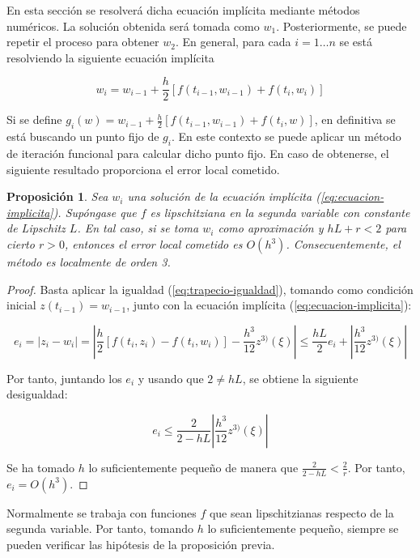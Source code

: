 \documentclass{article}
\theoremstyle{theorem-style}  %
\newtheorem{proposition}[theorem]{Proposición}
\theoremstyle{definition-style}
\theoremstyle{example-style}
\begin{document}
	En esta sección se resolverá dicha ecuación implícita mediante métodos numéricos. La solución obtenida será tomada como $w_1$. Posteriormente, se puede repetir el proceso para obtener $w_2$. En general, para cada $i = 1 \ldots n$ se está resolviendo la siguiente ecuación implícita

	\begin{equation} \label{eq:ecuacion-implicita}
		w_i = w_{i-1} + \frac{h}{2} \left[f(t_{i-1},w_{i-1}) + f(t_i, w_i)\right]
	\end{equation}

	Si se define $g_i(w) = w_{i-1} + \frac{h}{2} \left[f(t_{i-1},w_{i-1}) + f(t_i, w)\right]$, en definitiva se está buscando un punto fijo de $g_i$. En este contexto se puede aplicar un método de iteración funcional para calcular dicho punto fijo. En caso de obtenerse, el siguiente resultado proporciona el error local cometido.

	\begin{proposition} \label{prop:implicito:error}
		Sea $w_i$ una solución de la ecuación implícita (\ref{eq:ecuacion-implicita}). Supóngase que $f$ es lipschitziana en la segunda variable con constante de Lipschitz $L$. En tal caso, si se toma $w_i$ como aproximación y $hL+r < 2$ para cierto $r >0$, entonces el error local cometido es $O(h^3)$. Consecuentemente, el método es localmente de orden 3.
	\end{proposition}

	\begin{proof}
		Basta aplicar la igualdad (\ref{eq:trapecio-igualdad}), tomando como condición inicial $z(t_{i-1}) = w_{i-1}$, junto con la ecuación implícita (\ref{eq:ecuacion-implicita}):

		$$ e_i = \left|z_i - w_i \right| = \left|\frac{h}{2} \left[ f(t_i, z_i) - f(t_i, w_i) \right] - \frac{h^3}{12}z^{3)}(\xi) \right| \le \frac{hL}{2} e_i + \left|\frac{h^3}{12}z^{3)}(\xi) \right| $$

		Por tanto, juntando los $e_i$ y usando que $2 \ne hL$, se obtiene la siguiente desigualdad:

		$$ e_i \le \frac{2}{2-hL} \left|\frac{h^3}{12}z^{3)}(\xi) \right| $$

		Se ha tomado $h$ lo suficientemente pequeño de manera que $\frac{2}{2-hL} < \frac{2}{r}$. Por tanto, $e_i = O(h^3)$.
	\end{proof}

	Normalmente se trabaja con funciones $f$ que sean lipschitzianas respecto de la segunda variable. Por tanto, tomando $h$ lo suficientemente pequeño, siempre se pueden verificar las hipótesis de la proposición previa.
\end{document}
